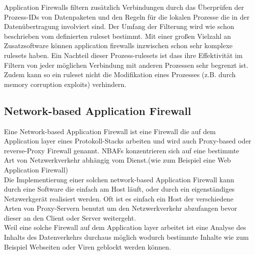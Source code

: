 \documentclass[11pt]{scrartcl}
\begin{document}
Application Firewalls filtern zusätzlich Verbindungen durch das Überprüfen der Prozess-IDs von Datenpaketen und den Regeln für die lokalen Prozesse die in der Datenübertragung involviert sind. Der Umfang der Filterung wird wie schon beschrieben vom definierten ruleset bestimmt. Mit einer großen Vielzahl an Zusatzsoftware können application firewalls inzwischen schon sehr komplexe rulesets haben. Ein Nachteil dieser Prozess-rulesets ist dass ihre Effektivität im Filtern von jeder möglichen Verbindung mit anderen Prozessen sehr begrenzt ist. Zudem kann so ein ruleset nicht die Modifikation eines Prozesses (z.B. durch memory corruption exploits) verhindern.
\cite{12}
\subsection{Network-based Application Firewall}
\label{sec:network-based application firewall}
Eine Network-based Application Firewall ist eine Firewall die auf dem Application layer eines Protokoll-Stacks arbeiten und wird auch Proxy-based oder reverse-Proxy Firewall genannt. NBAFs konzentrieren sich auf eine bestimmte Art von Netzwerkverkehr abhängig vom Dienst.(wie zum Beispiel eine Web Application Firewall)\\

Die Implementierung einer solchen network-based Application Firewall kann durch eine Software die einfach am Host läuft, oder durch ein eigenständiges Netzwerkgerät realisiert werden. Oft ist es einfach ein Host der verschiedene Arten von Proxy-Servern benutzt um den Netzwerkverkehr abzufangen bevor dieser an den Client oder Server weitergeht. \\
Weil eine solche Firewall auf dem Application layer arbeitet ist eine Analyse des Inhalts des Datenverkehrs durchaus möglich wodurch bestimmte Inhalte wie zum Beispiel Webseiten oder Viren geblockt werden können.
\cite{13}




\newpage
\mbox{}
\nocite{*}


\end{document}
